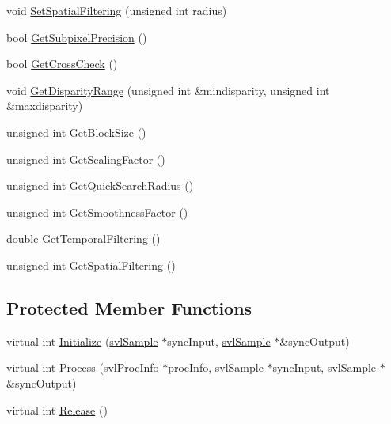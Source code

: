 \begin{DoxyCompactItemize}
\item 
void \hyperlink{classsvl_filter_computational_stereo_a1ff93f158c15c75f9bdbfbe3fc7f839f}{Set\+Spatial\+Filtering} (unsigned int radius)
\item 
bool \hyperlink{classsvl_filter_computational_stereo_a99fd778eca713298174b6de0b895472a}{Get\+Subpixel\+Precision} ()
\item 
bool \hyperlink{classsvl_filter_computational_stereo_a92734e4aeaefd2ac7555f193266c1c24}{Get\+Cross\+Check} ()
\item 
void \hyperlink{classsvl_filter_computational_stereo_a8a5e5d255fea88bb63a1e0f97671506f}{Get\+Disparity\+Range} (unsigned int \&mindisparity, unsigned int \&maxdisparity)
\item 
unsigned int \hyperlink{classsvl_filter_computational_stereo_a7e16047fd86e63abff87eac0b97cae89}{Get\+Block\+Size} ()
\item 
unsigned int \hyperlink{classsvl_filter_computational_stereo_a6028560c488697bf211a293d25e08911}{Get\+Scaling\+Factor} ()
\item 
unsigned int \hyperlink{classsvl_filter_computational_stereo_a965355a595658463d900756c73d88df4}{Get\+Quick\+Search\+Radius} ()
\item 
unsigned int \hyperlink{classsvl_filter_computational_stereo_a48a1b020a3bc04bd71fdc8fcb34b7748}{Get\+Smoothness\+Factor} ()
\item 
double \hyperlink{classsvl_filter_computational_stereo_a4cbc718032c81abe02fd8b8e81098750}{Get\+Temporal\+Filtering} ()
\item 
unsigned int \hyperlink{classsvl_filter_computational_stereo_ab59410ceb3d767f1f191edfed777bd30}{Get\+Spatial\+Filtering} ()
\end{DoxyCompactItemize}
\subsection*{Protected Member Functions}
\begin{DoxyCompactItemize}
\item 
virtual int \hyperlink{classsvl_filter_computational_stereo_a7f1dc5d6963c9dd69d8b99e672162909}{Initialize} (\hyperlink{classsvl_sample}{svl\+Sample} $\ast$sync\+Input, \hyperlink{classsvl_sample}{svl\+Sample} $\ast$\&sync\+Output)
\item 
virtual int \hyperlink{classsvl_filter_computational_stereo_ad2c3c7152f7bc9b3c4f59607071754d1}{Process} (\hyperlink{structsvl_proc_info}{svl\+Proc\+Info} $\ast$proc\+Info, \hyperlink{classsvl_sample}{svl\+Sample} $\ast$sync\+Input, \hyperlink{classsvl_sample}{svl\+Sample} $\ast$\&sync\+Output)
\item 
virtual int \hyperlink{classsvl_filter_computational_stereo_ad575ae786cce065ca19c01f536ca4d97}{Release} ()
\end{DoxyCompactItemize}
